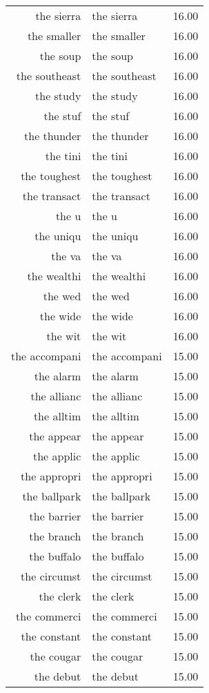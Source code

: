 \begin{table}[ht]
\begin{tabular}{rlr}
  the sierra & the sierra & 16.00 \\ 
  the smaller & the smaller & 16.00 \\ 
  the soup & the soup & 16.00 \\ 
  the southeast & the southeast & 16.00 \\ 
  the study & the study & 16.00 \\ 
  the stuf & the stuf & 16.00 \\ 
  the thunder & the thunder & 16.00 \\ 
  the tini & the tini & 16.00 \\ 
  the toughest & the toughest & 16.00 \\ 
  the transact & the transact & 16.00 \\ 
  the u & the u & 16.00 \\ 
  the uniqu & the uniqu & 16.00 \\ 
  the va & the va & 16.00 \\ 
  the wealthi & the wealthi & 16.00 \\ 
  the wed & the wed & 16.00 \\ 
  the wide & the wide & 16.00 \\ 
  the wit & the wit & 16.00 \\ 
  the accompani & the accompani & 15.00 \\ 
  the alarm & the alarm & 15.00 \\ 
  the allianc & the allianc & 15.00 \\ 
  the alltim & the alltim & 15.00 \\ 
  the appear & the appear & 15.00 \\ 
  the applic & the applic & 15.00 \\ 
  the appropri & the appropri & 15.00 \\ 
  the ballpark & the ballpark & 15.00 \\ 
  the barrier & the barrier & 15.00 \\ 
  the branch & the branch & 15.00 \\ 
  the buffalo & the buffalo & 15.00 \\ 
  the circumst & the circumst & 15.00 \\ 
  the clerk & the clerk & 15.00 \\ 
  the commerci & the commerci & 15.00 \\ 
  the constant & the constant & 15.00 \\ 
  the cougar & the cougar & 15.00 \\ 
  the debut & the debut & 15.00 \\ 

\end{tabular}
\end{table}
